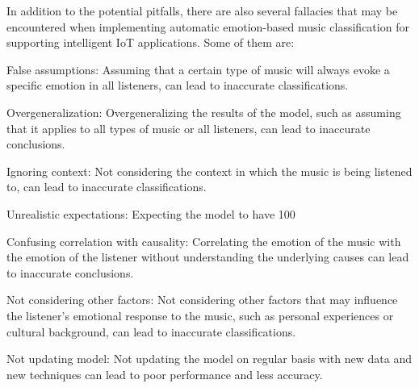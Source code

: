 \documentclass{report}
\begin{document}
\begin{multicols}{1}
\begin{itemize}
 In addition to the potential pitfalls, there are also several fallacies that may be encountered when implementing automatic emotion-based music classification for supporting intelligent IoT applications. Some of them are:

False assumptions: Assuming that a certain type of music will always evoke a specific emotion in all listeners, can lead to inaccurate classifications.

Overgeneralization: Overgeneralizing the results of the model, such as assuming that it applies to all types of music or all listeners, can lead to inaccurate conclusions.

Ignoring context: Not considering the context in which the music is being listened to, can lead to inaccurate classifications.

Unrealistic expectations: Expecting the model to have 100%

Confusing correlation with causality: Correlating the emotion of the music with the emotion of the listener without understanding the underlying causes can lead to inaccurate conclusions.

Not considering other factors: Not considering other factors that may influence the listener's emotional response to the music, such as personal experiences or cultural background, can lead to inaccurate classifications.

Not updating model: Not updating the model on regular basis with new data and new techniques can lead to poor performance and less accuracy.
    \end{itemize}
    
\end{multicols}
\end{document}
